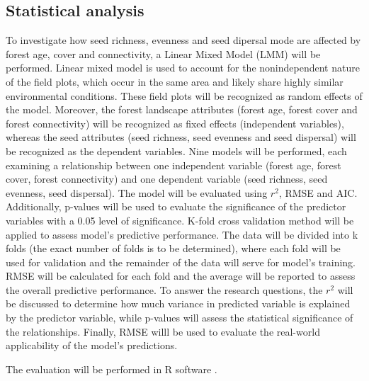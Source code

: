 \subsection{Statistical analysis}
To investigate how seed richness, evenness and seed dipersal mode are affected by forest age, cover and connectivity, a Linear Mixed Model (LMM) will be performed. Linear mixed model is used to account for the nonindependent nature of the field plots, which occur in the same area and likely share highly similar environmental conditions. These field plots will be recognized as random effects of the model. Moreover, the forest landscape attributes (forest age, forest cover and forest connectivity) will be recognized as fixed effects (independent variables), whereas the seed attributes (seed richness, seed evenness and seed dispersal) will be recognized as the dependent variables. Nine models will be performed, each examining a relationship between one independent variable (forest age, forest cover, forest connectivity)  and one dependent variable (seed richness, seed evenness, seed dispersal). The model will be evaluated using $r^2$, RMSE and AIC. Additionally, p-values will be used to evaluate the significance of the predictor variables with a 0.05 level of significance. K-fold cross validation method will be applied to assess model's predictive performance. The data will be divided into k folds (the exact number of folds is to be determined), where each fold will be used for validation and the remainder of the data will serve for model's training. RMSE will be calculated for each fold and the average will be reported to assess the overall predictive performance.
To answer the research questions, the $r^2$ will be discussed to determine how much variance in predicted variable is explained by the predictor variable, while p-values will assess the statistical significance of the relationships. Finally, RMSE willl be used to evaluate the real-world applicability of the model's predictions.  

The evaluation will be performed in R software \citep{R}.

 